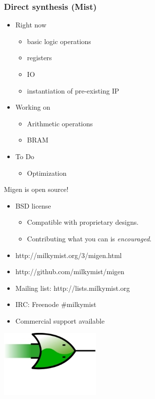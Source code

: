 \documentclass{beamer}
\newcommand\bgoff{\setbeamertemplate{background}{}}
\begin{document}
\begin{frame}
\frametitle{Direct synthesis (Mist)}
\begin{itemize}
\item Right now
\begin{itemize}
\item basic logic operations
\item registers
\item IO
\item instantiation of pre-existing IP
\end{itemize}
\item Working on
\begin{itemize}
\item Arithmetic operations
\item BRAM
\end{itemize}
\item To Do
\begin{itemize}
\item Optimization
\end{itemize}
\end{itemize}
\end{frame}

\bgoff

\begin{frame}
Migen is open source!
\begin{itemize}
\item BSD license
\begin{itemize}
\item Compatible with proprietary designs.
\item Contributing what you can is \textit{encouraged}.
\end{itemize}
\item http://milkymist.org/3/migen.html
\item http://github.com/milkymist/migen
\item Mailing list: http://lists.milkymist.org
\item IRC: Freenode \#milkymist
\item Commercial support available
\end{itemize}

\centering \includegraphics[width=5cm]{migen_logo.png}

\end{frame}
\end{document}

